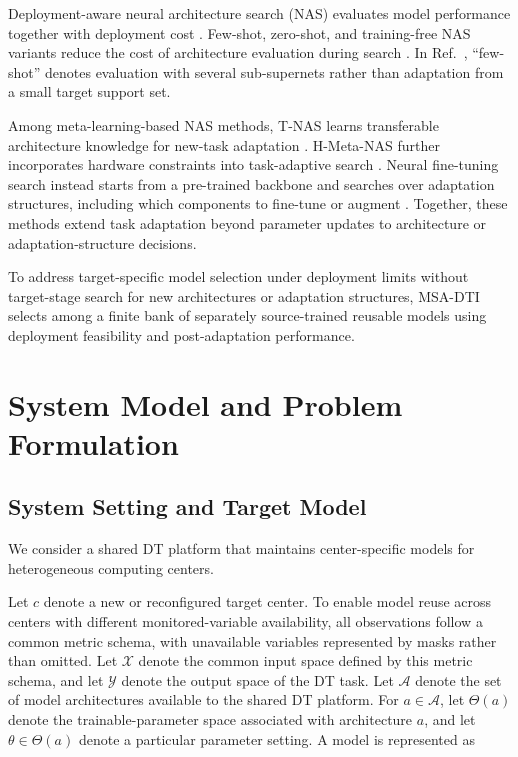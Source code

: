 \documentclass[a4paper,fleqn]{cas-sc}
\begin{document}
Deployment-aware neural architecture search (NAS) evaluates model performance
together with deployment cost \cite{ref12,ref13,ref26}. Few-shot, zero-shot,
and training-free NAS variants reduce the cost of architecture evaluation
during search \cite{ref14,ref15,ref16}. In Ref.~\cite{ref14}, ``few-shot''
denotes evaluation with several sub-supernets rather than adaptation from a
small target support set.

Among meta-learning-based NAS methods, T-NAS learns transferable architecture
knowledge for new-task adaptation \cite{ref31}. H-Meta-NAS further incorporates
hardware constraints into task-adaptive search \cite{ref30}. Neural
fine-tuning search instead starts from a pre-trained backbone and searches over
adaptation structures, including which components to fine-tune or augment
\cite{ref32}. Together, these methods extend task adaptation beyond parameter
updates to architecture or adaptation-structure decisions.

To address target-specific model selection under deployment limits without
target-stage search for new architectures or adaptation structures, MSA-DTI
selects among a finite bank of separately source-trained reusable models using
deployment feasibility and post-adaptation performance.

\section{System Model and Problem Formulation}
\label{sec:problem}

\subsection{System Setting and Target Model}

We consider a shared DT platform that maintains center-specific models for
heterogeneous computing centers.

Let $c$ denote a new or reconfigured target center. To enable model reuse
across centers with different monitored-variable availability, all observations
follow a common metric schema, with unavailable variables represented by masks
rather than omitted. Let $\mathcal{X}$ denote the common input space defined by
this metric schema, and let $\mathcal{Y}$ denote the output space of the DT
task. Let $\mathcal{A}$ denote the set of model architectures available to the
shared DT platform. For $a\in\mathcal{A}$, let $\Theta(a)$ denote the
trainable-parameter space associated with architecture $a$, and let
$\theta\in\Theta(a)$ denote a particular parameter setting. A model is
represented as
\end{document}
